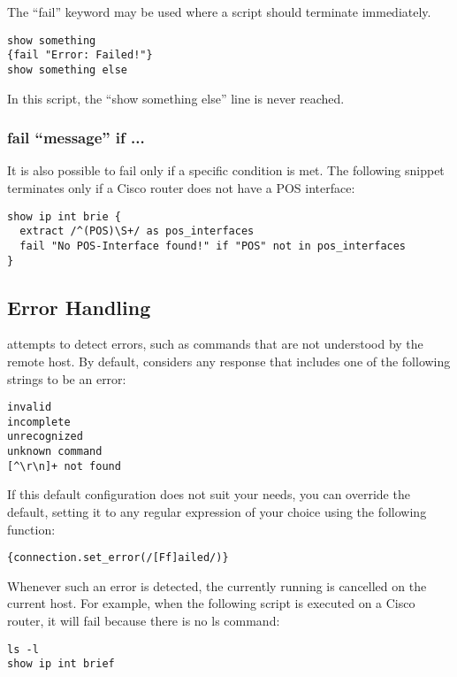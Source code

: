 The ``fail'' keyword may be used where a script should terminate immediately. 

\begin{lstlisting}
show something
{fail "Error: Failed!"}
show something else
\end{lstlisting}

In this script, the ``show something else'' line is never reached. 

\subsubsection{fail ``message'' if ...}

It is also possible to fail only if a specific condition is met. The 
following snippet terminates only if a Cisco router does not have a POS 
interface: 

\begin{lstlisting}
show ip int brie {
  extract /^(POS)\S+/ as pos_interfaces
  fail "No POS-Interface found!" if "POS" not in pos_interfaces
}
\end{lstlisting}


\subsection{Error Handling}

\product attempts to detect errors, such as commands that are not understood 
by the remote host. By default, \product considers any response that 
includes one of the following strings to be an error: 

\begin{lstlisting}
invalid
incomplete
unrecognized
unknown command
[^\r\n]+ not found
\end{lstlisting}

If this default configuration does not suit your needs, you can override the 
default, setting it to any regular expression of your choice using the 
following function: 

\begin{lstlisting}
{connection.set_error(/[Ff]ailed/)}
\end{lstlisting}

Whenever such an error is detected, the currently running \product is 
cancelled on the current host. For example, when the following script is 
executed on a Cisco router, it will fail because there is no ls command: 

\begin{lstlisting}
ls -l
show ip int brief
\end{lstlisting}

